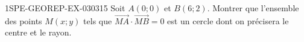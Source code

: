\begin{exercice}{1SPE-GEOREP-EX-030}{3}{15}
Soit $A(0 ; 0)$ et $B(6 ; 2)$. Montrer que l'ensemble des points $M(x ; y)$ tels que $\vec{MA} \cdot \vec{MB} = 0$ est un cercle dont on précisera le centre et le rayon.
\end{exercice}
